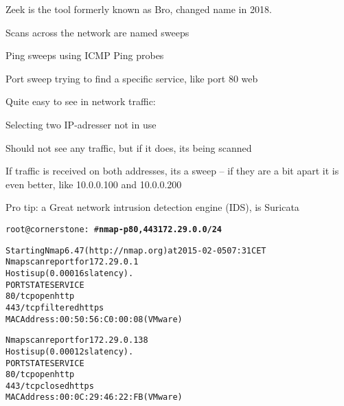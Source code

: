 \documentclass[Screen16to9,17pt]{foils}
\begin{document}
Zeek is the tool formerly known as Bro, changed name in 2018. 








\begin{list1}
\item Scans across the network are named sweeps
\item Ping sweeps using ICMP Ping probes
\item Port sweep trying to find a specific service, like port 80 web
\item Quite easy to see in network traffic:
\begin{list2}
\item Selecting two IP-adresser not in use
\item Should not see any traffic, but if it does, its being scanned
\item If traffic is received on both addresses, its a sweep -- if they are a bit apart it is even better, like 10.0.0.100 and 10.0.0.200
  \end{list2}

\vskip 2cm
Pro tip: a Great network intrusion detection engine (IDS), is Suricata 
\end{list1}



\begin{alltt}\small
root@cornerstone:~#{\bfseries  nmap -p80,443 172.29.0.0/24}

Starting Nmap 6.47 ( http://nmap.org ) at 2015-02-05 07:31 CET
Nmap scan report for 172.29.0.1
Host is up (0.00016s latency).
PORT    STATE    SERVICE
{\color{darkgreen}80/tcp  open     http}
443/tcp filtered https
MAC Address: 00:50:56:C0:00:08 (VMware)

Nmap scan report for 172.29.0.138
Host is up (0.00012s latency).
PORT    STATE  SERVICE
{\color{darkgreen}80/tcp  open   http}
443/tcp closed https
MAC Address: 00:0C:29:46:22:FB (VMware)

\end{alltt}



\end{document}
